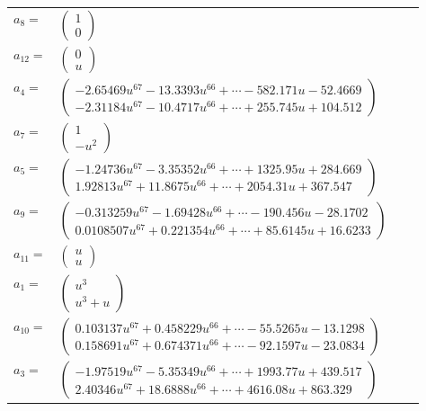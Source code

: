 \documentclass[1p]{elsarticle_modified}
\theoremstyle{definition}
\begin{document}
\begin{tabular}{m{7pt} m{180pt} m{7pt} m{180pt} }
\flushright $a_{8}=$&$\begin{pmatrix}1\\0\end{pmatrix}$ \\
\flushright $a_{12}=$&$\begin{pmatrix}0\\u\end{pmatrix}$ \\
\flushright $a_{4}=$&$\begin{pmatrix}-2.65469 u^{67}-13.3393 u^{66}+\cdots-582.171 u-52.4669\\-2.31184 u^{67}-10.4717 u^{66}+\cdots+255.745 u+104.512\end{pmatrix}$ \\
\flushright $a_{7}=$&$\begin{pmatrix}1\\- u^2\end{pmatrix}$ \\
\flushright $a_{5}=$&$\begin{pmatrix}-1.24736 u^{67}-3.35352 u^{66}+\cdots+1325.95 u+284.669\\1.92813 u^{67}+11.8675 u^{66}+\cdots+2054.31 u+367.547\end{pmatrix}$ \\
\flushright $a_{9}=$&$\begin{pmatrix}-0.313259 u^{67}-1.69428 u^{66}+\cdots-190.456 u-28.1702\\0.0108507 u^{67}+0.221354 u^{66}+\cdots+85.6145 u+16.6233\end{pmatrix}$ \\
\flushright $a_{11}=$&$\begin{pmatrix}u\\u\end{pmatrix}$ \\
\flushright $a_{1}=$&$\begin{pmatrix}u^3\\u^3+u\end{pmatrix}$ \\
\flushright $a_{10}=$&$\begin{pmatrix}0.103137 u^{67}+0.458229 u^{66}+\cdots-55.5265 u-13.1298\\0.158691 u^{67}+0.674371 u^{66}+\cdots-92.1597 u-23.0834\end{pmatrix}$ \\
\flushright $a_{3}=$&$\begin{pmatrix}-1.97519 u^{67}-5.35349 u^{66}+\cdots+1993.77 u+439.517\\2.40346 u^{67}+18.6888 u^{66}+\cdots+4616.08 u+863.329\end{pmatrix}$ \\

\end{tabular}
\end{document}
